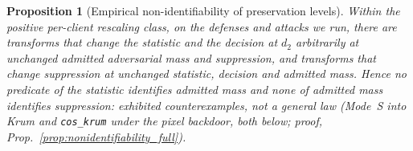 \documentclass{article}
\newtheorem{proposition}[theorem]{Proposition}
\begin{document}
\begin{proposition}[Empirical non-identifiability of preservation levels]
\label{prop:nonidentifiability}
Within the positive per-client rescaling class, on the defenses and attacks we run, there are transforms that change the statistic and the \emph{decision} at $d_2$ arbitrarily at \emph{unchanged} admitted adversarial mass and suppression, and transforms that change suppression at unchanged statistic, decision and admitted mass. Hence no predicate of the statistic identifies admitted mass and none of admitted mass identifies suppression: exhibited counterexamples, not a general law (Mode~S into Krum and \texttt{cos\_krum} under the pixel backdoor, both below; proof, Prop.~\ref{prop:nonidentifiability_full}).
\end{proposition}
\end{document}
